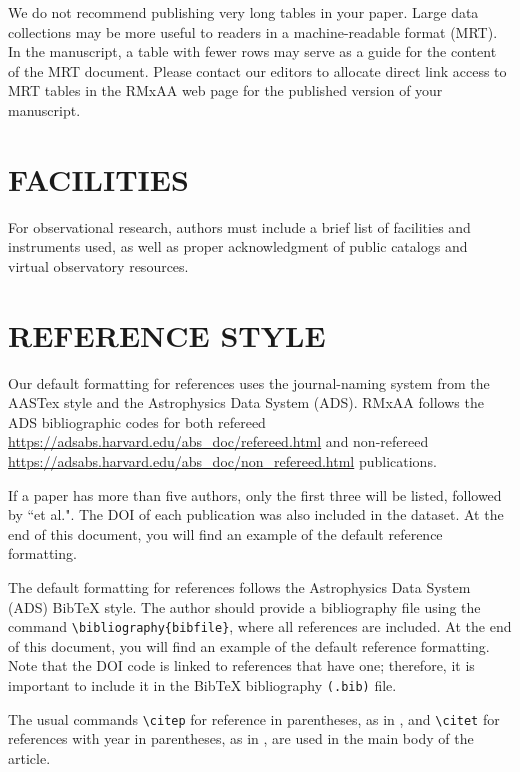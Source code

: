 \documentclass[9pt,twoside]{rmaa-rho-class/rmaa-rho_light}
\newcommand{\CS}[1]{\texttt{\textbackslash #1}}
\begin{document}
 We do not recommend publishing very long tables in your paper. Large data collections may be more useful to readers in a machine-readable format (MRT). In the manuscript, a table with fewer rows may serve as a guide for the content of the MRT document. Please contact our editors to allocate direct link access to MRT tables in the RMxAA web page for the published version of your manuscript. 


\section{FACILITIES}

For observational research, authors must include a brief list of facilities and instruments used, as well as proper acknowledgment of public catalogs and virtual observatory resources.

\section{REFERENCE STYLE}

    Our default formatting for references uses the journal-naming system from the AASTex style and the Astrophysics Data System (ADS). RMxAA follows the ADS bibliographic codes for both refereed \url{https://adsabs.harvard.edu/abs_doc/refereed.html} and non-refereed \url{https://adsabs.harvard.edu/abs_doc/non_refereed.html} publications.
    
    If a paper has more than five authors, only the first three will be listed, followed by ``et al.". The DOI of each publication was also included in the dataset. At the end of this document, you will find an example of the default reference formatting. 

    The default formatting for references follows the Astrophysics Data System (ADS) BibTeX style. The author should provide a bibliography file using the command \CS{bibliography}\verb|{bibfile}|, where all references are included. At the end of this document, you will find an example of the default reference formatting. Note that the DOI code is linked to references that have one; therefore, it is important to include it in the BibTeX bibliography \texttt{(.bib)} file.
    
    The usual commands \CS{citep} for reference in parentheses, as in \citep{Roman23},  and \CS{citet} for references with year in parentheses, as in \citet{Roman23}, are used in the main body of the article.
\end{document}
